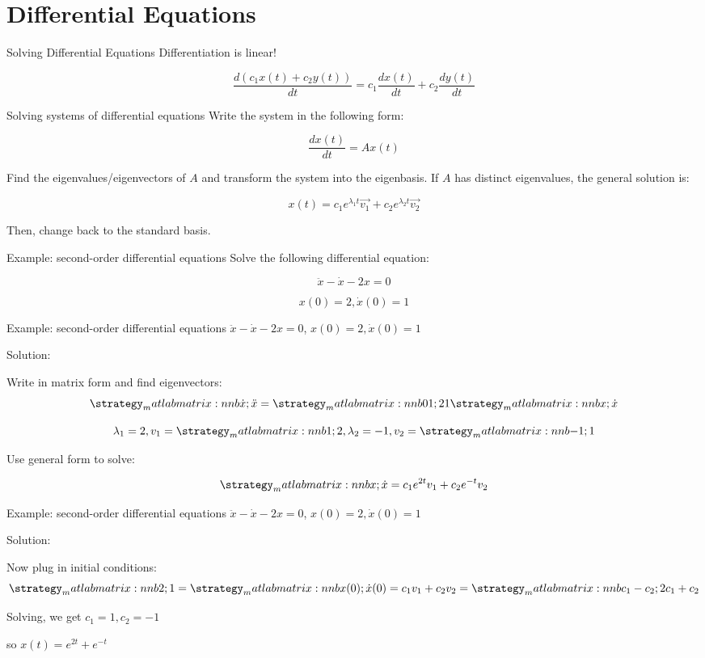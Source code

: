 \section{Differential Equations}
    \begin{frame}{Solving Differential Equations}
	    Differentiation is linear!
	    
	    $$\frac{d(c_1x(t) + c_2y(t))}{dt} = c_1\frac{dx(t)}{dt} + c_2\frac{dy(t)}{dt}$$
	\end{frame}
	
	\begin{frame}{Solving systems of differential equations}
	    Write the system in the following form:

        $$\frac{dx(t)}{dt} = Ax(t)$$
        
        Find the eigenvalues/eigenvectors of $A$ and transform the system into the eigenbasis. If $A$ has distinct eigenvalues, the general solution is:
        
        $$x(t) = c_1e^{\lambda_1{t}}\vec{v_1} + c_2e^{\lambda_2{t}}\vec{v_2}$$
        
        Then, change back to the standard basis.
	\end{frame}
	
	\begin{frame}{Example: second-order differential equations}
	    Solve the following differential equation:

        $$\ddot{x} - \dot{x} - 2x = 0$$
        
        $$x(0) = 2, \dot{x}(0) = 1$$
	\end{frame}
	
	\begin{frame}{Example: second-order differential equations}
	    $\ddot{x} - \dot{x} - 2x = 0$, $x(0) = 2, \dot{x}(0) = 1$
	    
	    Solution:
	    
	    Write in matrix form and find eigenvectors:
	    $$\mat{\dot{x};\ddot{x}} = \mat{0 1; 2 1}\mat{x;\dot{x}}$$
	    
	    $$\lambda_1 = 2, v_1 = \mat{1;2}, \lambda_2 = -1, v_2 = \mat{-1;1}$$
	    
	    Use general form to solve:
	    
	    $$\mat{x;\dot{x}} = c_1e^{2t}v_1 + c_2e^{-t}v_2$$
	\end{frame}
	
	\begin{frame}{Example: second-order differential equations}
	    $\ddot{x} - \dot{x} - 2x = 0$, $x(0) = 2, \dot{x}(0) = 1$
	    
	    Solution:
	    
	    Now plug in initial conditions:
	    $$\mat{2;1} = \mat{x(0); \dot{x}(0)} = c_1v_1 + c_2v_2 = \mat{c_1-c_2;2c_1+c_2}$$
	    
	    Solving, we get $c_1 = 1, c_2 = -1$
	    
	    so $x(t) = e^{2t} + e^{-t}$
	\end{frame}
	

